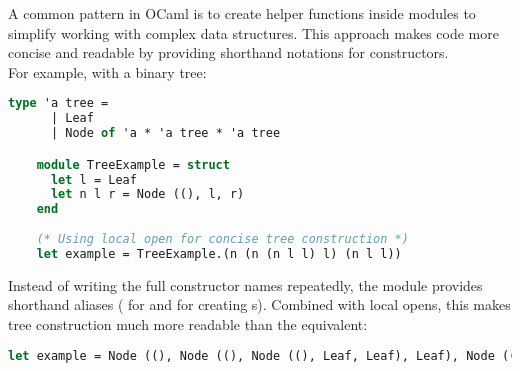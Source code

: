 \begin{Def}
    
    A common pattern in OCaml is to create helper functions inside modules to simplify working with complex data structures. 
    This approach makes code more concise and readable by providing shorthand notations for constructors.\\

    \noindent
    For example, with a binary tree:
    
    \begin{lstlisting}[language=OCaml, numbers=none]
    type 'a tree =
      | Leaf
      | Node of 'a * 'a tree * 'a tree

    module TreeExample = struct
      let l = Leaf
      let n l r = Node ((), l, r)
    end
    
    (* Using local open for concise tree construction *)
    let example = TreeExample.(n (n (n l l) l) (n l l))
    \end{lstlisting}
    
    \noindent
    Instead of writing the full constructor names repeatedly, the module provides shorthand aliases ( for  and  for creating s). Combined with local opens, this makes tree construction much more readable than the equivalent:
    \begin{lstlisting}[language=OCaml, numbers=none]
    let example = Node ((), Node ((), Node ((), Leaf, Leaf), Leaf), Node ((), Leaf, Leaf))
    \end{lstlisting}
\end{Def}